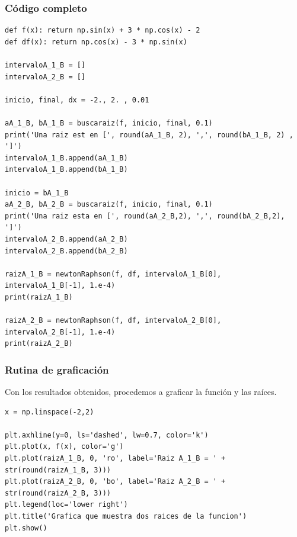 \begin{frame}
\frametitle{Código completo}
\begin{lstlisting}[caption=Intervalos para las raíces, style=codigopython]
def f(x): return np.sin(x) + 3 * np.cos(x) - 2
def df(x): return np.cos(x) - 3 * np.sin(x)

intervaloA_1_B = []
intervaloA_2_B = []

inicio, final, dx = -2., 2. , 0.01

aA_1_B, bA_1_B = buscaraiz(f, inicio, final, 0.1)
print('Una raiz est en [', round(aA_1_B, 2), ',', round(bA_1_B, 2) , ']')
intervaloA_1_B.append(aA_1_B)
intervaloA_1_B.append(bA_1_B)

inicio = bA_1_B
aA_2_B, bA_2_B = buscaraiz(f, inicio, final, 0.1)
print('Una raiz esta en [', round(aA_2_B,2), ',', round(bA_2_B,2), ']')
intervaloA_2_B.append(aA_2_B)
intervaloA_2_B.append(bA_2_B)

raizA_1_B = newtonRaphson(f, df, intervaloA_1_B[0], intervaloA_1_B[-1], 1.e-4)
print(raizA_1_B)

raizA_2_B = newtonRaphson(f, df, intervaloA_2_B[0], intervaloA_2_B[-1], 1.e-4)
print(raizA_2_B)
\end{lstlisting}
\end{frame}
\begin{frame}
\frametitle{Rutina de graficación}
Con los resultados obtenidos, procedemos a graficar la función y las raíces.
\begin{lstlisting}[caption=Gráfica con las raíces, style=codigopython]
x = np.linspace(-2,2)

plt.axhline(y=0, ls='dashed', lw=0.7, color='k')
plt.plot(x, f(x), color='g')
plt.plot(raizA_1_B, 0, 'ro', label='Raiz A_1_B = ' + str(round(raizA_1_B, 3)))
plt.plot(raizA_2_B, 0, 'bo', label='Raiz A_2_B = ' + str(round(raizA_2_B, 3)))
plt.legend(loc='lower right')
plt.title('Grafica que muestra dos raices de la funcion')
plt.show()
\end{lstlisting}    
\end{frame}
